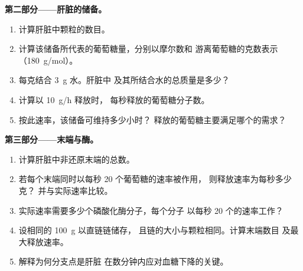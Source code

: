\begin{problem}
\medskip
\noindent\textbf{第二部分——肝脏的储备。}
\begin{enumerate}[resume]
  \item 计算肝脏中颗粒的数目。
  \item 计算该储备所代表的葡萄糖量，分别以摩尔数和
        游离葡萄糖的克数表示（\qty{180}{g/mol}）。
  \item {}每克结合 \qty{3}{g} 水。肝脏中
        及其所结合水的总质量是多少？
  \item 计算以 \qty{10}{g/h} 释放时，
        每秒释放的葡萄糖分子数。
  \item 按此速率，该储备可维持多少小时？
        释放的葡萄糖主要满足哪个的需求？
\end{enumerate}

\medskip
\noindent\textbf{第三部分——末端与酶。}
\begin{enumerate}[resume]
  \item 计算肝脏中非还原末端的总数。
  \item 若每个末端同时以每秒 \qty{20}{} 个葡萄糖的速率被作用，
        则释放速率为每秒多少克？
        并与实际速率比较。
  \item 实际速率需要多少个磷酸化酶分子，每个分子
        以每秒 \qty{20}{} 个的速率工作？
  \item 设相同的 \qty{100}{g} 以直链链储存，
        且链的大小与颗粒相同。计算末端数目
        及最大释放速率。
  \item 解释为何分支点是肝脏
        在数分钟内应对血糖下降的关键。
\end{enumerate}


\end{problem}
